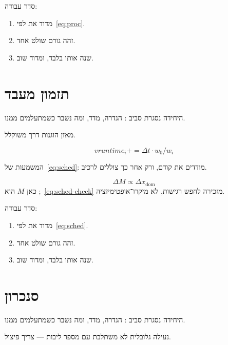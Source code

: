 סדר עבודה:
\begin{enumerate}
\item[(\textbf{א})] מדוד את  לפי~\eqref{eq:proc}.
\item[(\textbf{ב})] זהה גורם שולט אחד.
\item[(\textbf{ג})] שנה אותו בלבד, ומדוד שוב.
\end{enumerate}

\chapter{תזמון מעבד}
\label{ch:sched}

היחידה נסגרת סביב : הגדרה, מדד, ומה נשבר כשמתעלמים ממנו.

\begin{keybox}[frametitle={רעיון מפתח — תזמון מעבד}]
 מאזן הוגנות דרך  משוקלל.
\end{keybox}

\begin{equation}
\label{eq:sched}
vruntime_i += \Delta t \cdot w_0/w_i
\end{equation}

המשמעות של~\eqref{eq:sched}: מודדים את  קודם, ורק אחר כך צוללים לרכיב.

\begin{equation}
\label{eq:sched-check}
\Delta M \propto \Delta x_{\mathrm{dom}}
\end{equation}
כאן $M$ הוא ;~\eqref{eq:sched-check} מזכירה לחפש רגישות, לא מיקרו־אופטימיזציה.

סדר עבודה:
\begin{enumerate}
\item[(\textbf{א})] מדוד את  לפי~\eqref{eq:sched}.
\item[(\textbf{ב})] זהה גורם שולט אחד.
\item[(\textbf{ג})] שנה אותו בלבד, ומדוד שוב.
\end{enumerate}

\chapter{סנכרון}
\label{ch:sync}

היחידה נסגרת סביב : הגדרה, מדד, ומה נשבר כשמתעלמים ממנו.

\begin{warnbox}[frametitle={מלכודת — סנכרון}]
נעילה גלובלית לא משתלבת עם מספר ליבות — צריך פיצול.
\end{warnbox}


